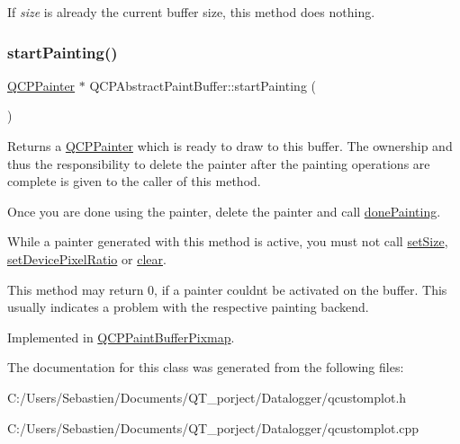 If {\itshape size} is already the current buffer size, this method does nothing. \mbox{\label{class_q_c_p_abstract_paint_buffer_a9e9f29b19c033cf02fb96f1a148463f3}} 
\subsubsection{\texorpdfstring{start\+Painting()}{startPainting()}}
{\footnotesize\ttfamily \hyperlink{class_q_c_p_painter}{Q\+C\+P\+Painter} $\ast$ Q\+C\+P\+Abstract\+Paint\+Buffer\+::start\+Painting (\begin{DoxyParamCaption}{ }\end{DoxyParamCaption})\hspace{0.3cm}{\ttfamily [pure virtual]}}

Returns a \hyperlink{class_q_c_p_painter}{Q\+C\+P\+Painter} which is ready to draw to this buffer. The ownership and thus the responsibility to delete the painter after the painting operations are complete is given to the caller of this method.

Once you are done using the painter, delete the painter and call \hyperlink{class_q_c_p_abstract_paint_buffer_a41b0dc6e7744f19fae09f8532c207dc1}{done\+Painting}.

While a painter generated with this method is active, you must not call \hyperlink{class_q_c_p_abstract_paint_buffer_a8b68c3cd36533f1a4a23b5ce8cd66f01}{set\+Size}, \hyperlink{class_q_c_p_abstract_paint_buffer_a555eaad5d5c806420ff35602a1bb68fa}{set\+Device\+Pixel\+Ratio} or \hyperlink{class_q_c_p_abstract_paint_buffer_a9e253f4541dfc01992b77e8830bd7722}{clear}.

This method may return 0, if a painter couldn\textquotesingle{}t be activated on the buffer. This usually indicates a problem with the respective painting backend. 

Implemented in \hyperlink{class_q_c_p_paint_buffer_pixmap_a357964ef7d28cfa530338be4e5c93234}{Q\+C\+P\+Paint\+Buffer\+Pixmap}.



The documentation for this class was generated from the following files\+:\begin{DoxyCompactItemize}
\item 
C\+:/\+Users/\+Sebastien/\+Documents/\+Q\+T\+\_\+porject/\+Datalogger/qcustomplot.\+h\item 
C\+:/\+Users/\+Sebastien/\+Documents/\+Q\+T\+\_\+porject/\+Datalogger/qcustomplot.\+cpp\end{DoxyCompactItemize}

